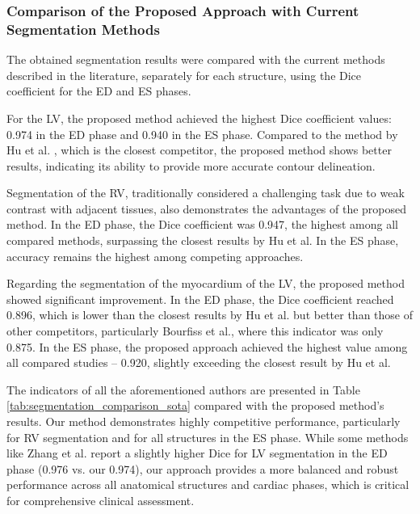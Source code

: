 \documentclass[fleqn,10pt]{wlscirep}
\begin{document}
\subsubsection*{Comparison of the Proposed Approach with Current Segmentation Methods}

The obtained segmentation results were compared with the current methods described in the literature, separately for each structure, using the Dice coefficient for the ED and ES phases.

For the LV, the proposed method achieved the highest Dice coefficient values: 0.974 in the ED phase and 0.940 in the ES phase. Compared to the method by Hu et al. \cite{Hu:2023}, which is the closest competitor, the proposed method shows better results, indicating its ability to provide more accurate contour delineation.

Segmentation of the RV, traditionally considered a challenging task due to weak contrast with adjacent tissues, also demonstrates the advantages of the proposed method. In the ED phase, the Dice coefficient was 0.947, the highest among all compared methods, surpassing the closest results by Hu et al. In the ES phase, accuracy remains the highest among competing approaches.

Regarding the segmentation of the myocardium of the LV, the proposed method showed significant improvement. In the ED phase, the Dice coefficient reached 0.896, which is lower than the closest results by Hu et al. but better than those of other competitors, particularly Bourfiss et al., where this indicator was only 0.875. In the ES phase, the proposed approach achieved the highest value among all compared studies -- 0.920, slightly exceeding the closest result by Hu et al.

The indicators of all the aforementioned authors are presented in Table \ref{tab:segmentation_comparison_sota} compared with the proposed method's results. Our method demonstrates highly competitive performance, particularly for RV segmentation and for all structures in the ES phase. While some methods like Zhang et al. \cite{Zhang:2022} report a slightly higher Dice for LV segmentation in the ED phase (0.976 vs. our 0.974), our approach provides a more balanced and robust performance across all anatomical structures and cardiac phases, which is critical for comprehensive clinical assessment.
\end{document}
